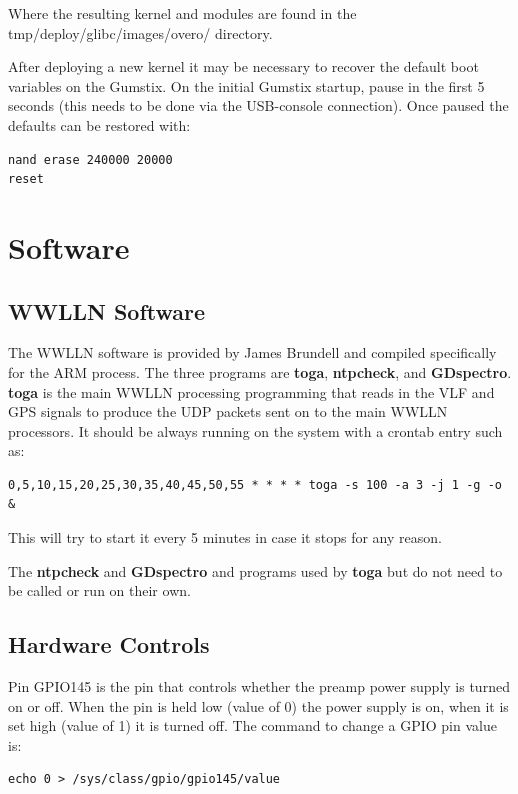 Where the resulting kernel and modules are found in the tmp/deploy/glibc/images/overo/ directory.

After deploying a new kernel it may be necessary to recover the default boot variables on the Gumstix.
On the initial Gumstix startup, pause in the first 5 seconds (this needs to be done via the USB-console connection).
Once paused the defaults can be restored with:

\begin{verbatim}
nand erase 240000 20000
reset
\end{verbatim}

\section{Software}

\subsection{WWLLN Software}

The WWLLN software is provided by James Brundell and compiled specifically for the ARM process.
The three programs are {\bf toga}, {\bf ntpcheck}, and {\bf GDspectro}.
{\bf toga} is the main WWLLN processing programming that reads in the VLF and GPS signals to produce the UDP packets sent on to the main WWLLN processors.
It should be always running on the system with a crontab entry such as:

\begin{verbatim}
0,5,10,15,20,25,30,35,40,45,50,55 * * * * toga -s 100 -a 3 -j 1 -g -o &
\end{verbatim}

This will try to start it every 5 minutes in case it stops for any reason.

The {\bf ntpcheck} and {\bf GDspectro} and programs used by {\bf toga} but do not need to be called or run on their own.

\subsection{Hardware Controls}

Pin GPIO145 is the pin that controls whether the preamp power supply is turned on or off.
When the pin is held low (value of 0) the power supply is on, when it is set high (value of 1) it is turned off.
The command to change a GPIO pin value is:

\begin{verbatim}
echo 0 > /sys/class/gpio/gpio145/value
\end{verbatim}

